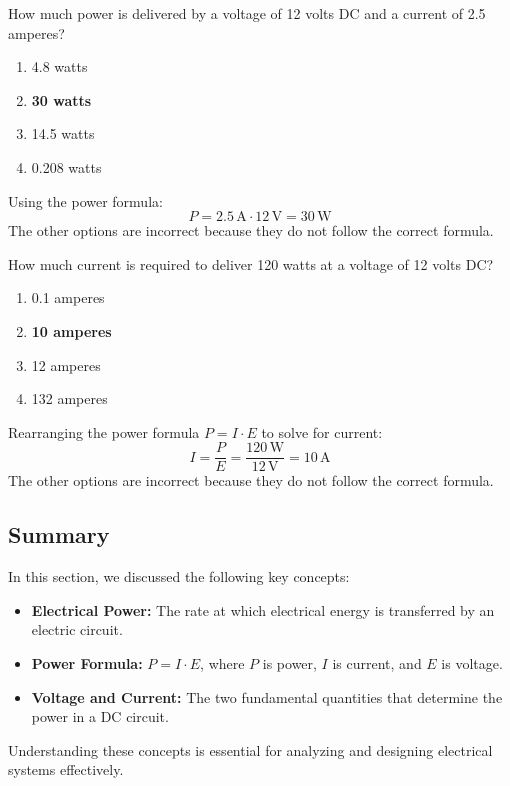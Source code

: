 
\begin{tcolorbox}[colback=gray!10!white,colframe=black!75!black,title={T5C10}]
    How much power is delivered by a voltage of 12 volts DC and a current of 2.5 amperes?
    \begin{enumerate}[label=\Alph*),noitemsep]
        \item 4.8 watts
        \item \textbf{30 watts}
        \item 14.5 watts
        \item 0.208 watts
    \end{enumerate}
\end{tcolorbox}
Using the power formula:
\[
P = 2.5 \, \text{A} \cdot 12 \, \text{V} = 30 \, \text{W}
\]
The other options are incorrect because they do not follow the correct formula.


\begin{tcolorbox}[colback=gray!10!white,colframe=black!75!black,title={T5C11}]
    How much current is required to deliver 120 watts at a voltage of 12 volts DC?
    \begin{enumerate}[label=\Alph*),noitemsep]
        \item 0.1 amperes
        \item \textbf{10 amperes}
        \item 12 amperes
        \item 132 amperes
    \end{enumerate}
\end{tcolorbox}
Rearranging the power formula \( P = I \cdot E \) to solve for current:
\[
I = \frac{P}{E} = \frac{120 \, \text{W}}{12 \, \text{V}} = 10 \, \text{A}
\]
The other options are incorrect because they do not follow the correct formula.


\subsection*{Summary}
In this section, we discussed the following key concepts:
\begin{itemize}
    \item \textbf{Electrical Power:} The rate at which electrical energy is transferred by an electric circuit.
    \item \textbf{Power Formula:} \( P = I \cdot E \), where \( P \) is power, \( I \) is current, and \( E \) is voltage.
    \item \textbf{Voltage and Current:} The two fundamental quantities that determine the power in a DC circuit.
\end{itemize}
Understanding these concepts is essential for analyzing and designing electrical systems effectively.
